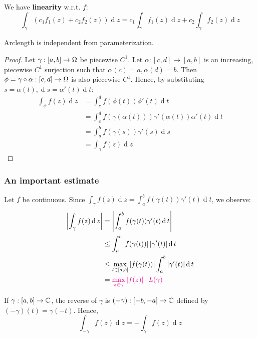\documentclass[12pt]{article}
\renewcommand{\d}{\ensuremath{\operatorname{d}}}
\begin{document}
We have \textbf{linearity} w.r.t. $f$: \[\int_{\gamma}\left( c_1f_1(z)+c_2f_2(z) \right)\d z=c_1\int_{\gamma}f_1(z)\d z+c_2\int_{\gamma}f_2(z)\d z\]

\rmk Arclength is independent from parameterization.
\begin{proof}
    Let $\gamma:[a,b]\to \Omega$ be piecewise $C^1$. Let $\alpha:[c,d] \to [a,b]$ is an increasing, piecewise $C^1$ surjection such that $\alpha(c)=a, \alpha(d)=b$. Then $\phi=\gamma\circ \alpha:[c,d]\to \Omega$ is also piecewise $C^1$. Hence, by substituting $s=\alpha(t), \d s=\alpha'(t)\d t$:
    \begin{align*}
        \int_{\phi}f(z)\d z&=\int_{c}^{d}f(\phi(t))\phi'(t)\d t\\
        &= \int_{c}^{d}f(\gamma(\alpha(t)))\gamma'(\alpha(t))\alpha'(t)\d t\\
        &= \int_{a}^{b}f(\gamma(s))\gamma'(s)\d s\\
        &= \int_{\gamma}f(z)\d z
    \end{align*}
\end{proof}

\subsubsection{An important estimate}
Let $f$ be continuous. Since \(\int_{\gamma}f(z)\d z=\int_{a}^{b}f(\gamma(t))\gamma'(t)\d t\), we observe: \begin{align*}
    \left|\int_{\gamma}f(z)\d z\right|&=\left|\int_{a}^{b}f(\gamma(t))\gamma'(t)\d t\right|\\
    &\leq \int_{a}^{b}|f(\gamma(t))|\,|\gamma'(t)|\d t\\
    &\leq \max_{t\in [a,b]}|f(\gamma(t))| \int_{a}^{b}|\gamma'(t)|\d t\\
    &= \rt{\max_{z\in \gamma}|f(z)|\cdot L(\gamma)}
\end{align*}


 If $\gamma:[a,b]\to\mathbb{C}$, the reverse of $\gamma$ is $(-\gamma):[-b,-a]\to\mathbb{C}$ defined by $(-\gamma)(t)=\gamma(-t)$.  Hence, \[\int_{-\gamma}f(z)\d z= -\int_{\gamma}f(z)\d z\]
\end{document}
